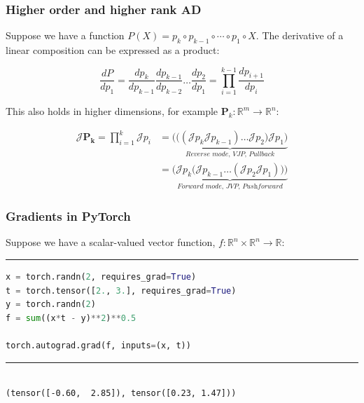 \documentclass{beamer}
\begin{document}
    \begin{frame}
        \frametitle{Higher order and higher rank AD}

        Suppose we have a function $P(X) = p_k \circ p_{k-1} \circ \cdots \circ p_1 \circ X$. The derivative of a linear composition can be expressed as a product:

        \begin{equation*}
            \label{eq:sfun_chain_rule}
            \frac{dP}{dp_1} = \frac{dp_k}{dp_{k-1}}\frac{dp_{k-1}}{dp_{k-2}}\dots\frac{dp_2}{dp_1}= {\displaystyle \prod_{i=1}^{k-1} \frac{dp_{i+1}}{dp_{i}}}
        \end{equation*}

        This also holds in higher dimensions, for example $\mathbf{P}_k: \mathbb{R}^m\rightarrow\mathbb{R}^n$:

        \begin{align*}
            \label{eq:vfun_chain_rule}
            \mathcal{J} \mathbf{P_k} = \displaystyle \prod_{i=1}^{k} \mathcal{J}p_i &= \underbrace{\bigg(\Big((\mathcal{J}p_k \mathcal{J}p_{k-1}) \dots \mathcal{J}p_2\Big) \mathcal{J}p_1\bigg)}_{\textit{Reverse mode, VJP, Pullback}} \\
            &= \underbrace{\bigg(\mathcal{J}p_k \Big(\mathcal{J}p_{k-1} \dots (\mathcal{J}p_2 \mathcal{J}p_1)\Big)\bigg)}_{\textit{Forward mode, JVP, Pushforward}}
        \end{align*}
    \end{frame}

    \begin{frame}[fragile]
        \frametitle{Gradients in PyTorch}

        Suppose we have a scalar-valued vector function, $f: \mathbb{R}^{n}\times\mathbb{R}^{n}\rightarrow\mathbb{R}$:

        \noindent\rule{\textwidth}{0.5pt}

        \begin{lstlisting}[language=Python]
x = torch.randn(2, requires_grad=True)
t = torch.tensor([2., 3.], requires_grad=True)
y = torch.randn(2)
f = sum((x*t - y)**2)**0.5

torch.autograd.grad(f, inputs=(x, t))
        \end{lstlisting}

        \noindent\rule{\textwidth}{0.5pt}
        \begin{lstlisting}

(tensor([-0.60,  2.85]), tensor([0.23, 1.47]))
        \end{lstlisting}
    \end{frame}
\end{document}
